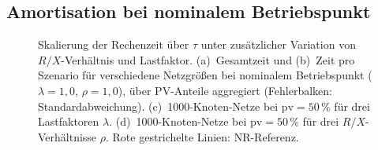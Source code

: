 %
%

\subsection{Amortisation bei nominalem Betriebspunkt}
\label{subsec:batch_amortisation}
\label{subsec:batch_breakeven}
\label{subsec:batch_total_time}
\label{subsec:batch_pv}
\begin{figure}[htbp]
	\centering
	
	\caption{Skalierung der Rechenzeit über $\tau$ unter zusätzlicher Variation
		von $R/X$-Verhältnis und Lastfaktor. (a)~Gesamtzeit und (b)~Zeit pro
		Szenario für verschiedene Netzgrößen bei nominalem Betriebspunkt
		($\lambda=1{,}0$, $\rho=1{,}0$), über PV-Anteile aggregiert (Fehlerbalken:
		Standardabweichung). (c)~1000-Knoten-Netze bei $\mathrm{pv}=50\,\%$ für
		drei Lastfaktoren $\lambda$. (d)~1000-Knoten-Netze bei $\mathrm{pv}=50\,\%$
		für drei $R/X$-Verhältnisse $\rho$. Rote gestrichelte Linien: NR-Referenz.}
	\label{fig:tau_thorough_analysis}
\end{figure}

